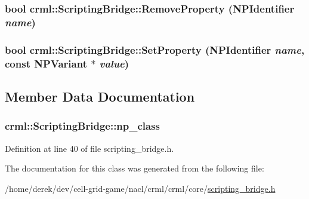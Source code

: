 \label{classcrml_1_1_scripting_bridge_a0de2960917327478a47eee5d7f780107}
\hypertarget{classcrml_1_1_scripting_bridge_a406ed77fb660dc3879a71e3ebb59b0a4}{
\subsubsection[{RemoveProperty}]{\setlength{\rightskip}{0pt plus 5cm}bool crml::ScriptingBridge::RemoveProperty ({\bf NPIdentifier} {\em name})}}
\label{classcrml_1_1_scripting_bridge_a406ed77fb660dc3879a71e3ebb59b0a4}
\hypertarget{classcrml_1_1_scripting_bridge_acbdfa02a2c2e6c6358fbaa825b725230}{
\subsubsection[{SetProperty}]{\setlength{\rightskip}{0pt plus 5cm}bool crml::ScriptingBridge::SetProperty ({\bf NPIdentifier} {\em name}, \/  const {\bf NPVariant} $\ast$ {\em value})}}
\label{classcrml_1_1_scripting_bridge_acbdfa02a2c2e6c6358fbaa825b725230}


\subsection{Member Data Documentation}
\hypertarget{classcrml_1_1_scripting_bridge_a1a005096b44959f11d3759a6c3540534}{
\subsubsection[{np\_\-class}]{ {\bf crml::ScriptingBridge::np\_\-class}}}
\label{classcrml_1_1_scripting_bridge_a1a005096b44959f11d3759a6c3540534}


Definition at line 40 of file scripting\_\-bridge.h.



The documentation for this class was generated from the following file:\begin{DoxyCompactItemize}
\item 
/home/derek/dev/cell-\/grid-\/game/nacl/crml/crml/core/\hyperlink{core_2scripting__bridge_8h}{scripting\_\-bridge.h}\end{DoxyCompactItemize}
